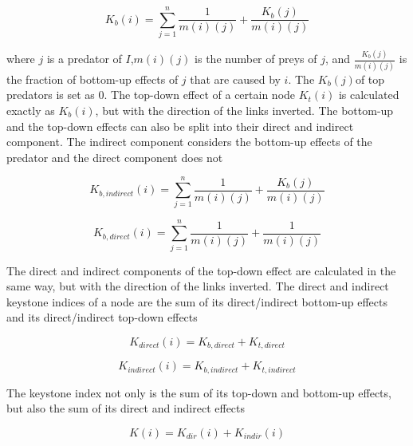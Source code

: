 \documentclass[twocolumn]{article}
\begin{document}
						\begin{equation}
							K_b\left(i\right)=\sum_{j=1}^{n}\frac{1}{m\left(i\right)\left(j\right)}+\frac{K_b\left(j\right)}{m\left(i\right)\left(j\right)}
						\end{equation}

		\noindent where $j$ is a predator of $I$,$m(i)(j)$ is the number of preys of $j$, and $\frac{K_b\left(j\right)}{m\left(i\right)\left(j\right)}$ is the fraction of bottom-up effects of $j$ that are caused by $i$. The $K_b\left(j\right)$of top predators is set as 0. The top-down effect of a certain node $K_t\left(i\right)$ is calculated exactly as $K_b\left(i\right)$, but with the direction of the links inverted. The bottom-up and the top-down effects can also be split into their direct and indirect component. The indirect component considers the bottom-up effects of the predator and the direct component does not

					\begin{equation}
						K_{b,indirect}\left(i\right)=\sum_{j=1}^{n}\frac{1}{m\left(i\right)\left(j\right)}+\frac{K_b\left(j\right)}{m\left(i\right)\left(j\right)}
					\end{equation}

					\begin{equation}
						K_{b,direct}\left(i\right)=\sum_{j=1}^{n}\frac{1}{m\left(i\right)\left(j\right)}+\frac{1}{m\left(i\right)\left(j\right)}
					\end{equation}

		The direct and indirect components of the top-down effect are calculated in the same way, but with the direction of the links inverted. The direct and indirect keystone indices of a node are the sum of its direct/indirect bottom-up effects and its direct/indirect top-down effects

					\begin{equation}
						K_{direct}(i)=K_{b,direct}+K_{t,direct}
					\end{equation}

					\begin{equation}
						K_{indirect}(i)=K_{b,indirect}+K_{t,indirect}
					\end{equation}

		The keystone index not only is the sum of its top-down and bottom-up effects, but also the sum of its direct and indirect effects

					\begin{equation}
						K\left(i\right)=K_{dir}\left(i\right)+K_{indir}\left(i\right)
					\end{equation}
\end{document}
